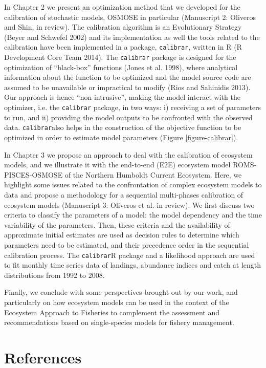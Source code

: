 In Chapter 2 we present an optimization method that we developed for the calibration of stochastic models, OSMOSE in particular (Manuscript 2: Oliveros and Shin, in review). The calibration algorithm is an Evolutionary Strategy (Beyer and Schwefel 2002) and its implementation as well the tools related to the calibration have been implemented in a package, \texttt{calibrar}, written in R (R Development Core Team 2014). The \texttt{calibrar} package is designed for the optimization of “black-box” functions (Jones et al. 1998), where analytical information about the function to be optimized and the model source code are assumed to be unavailable or impractical to modify (Rios and Sahinidis 2013). Our approach is hence “non-intrusive”, making the model interact with the optimizer, i.e. the \texttt{calibrar} package, in two ways: i) receiving a set of parameters to run, and ii) providing the model outputs to be confronted with the observed data. \texttt{calibrar}also helps in the construction of the objective function to be optimized in order to estimate model parameters (Figure \ref{figure-calibrar}).

In Chapter 3 we propose an approach to deal with the calibration of ecosystem models, and we illustrate it with the end-to-end (E2E) ecosystem model ROMS-PISCES-OSMOSE of the Northern Humboldt Current Ecosystem. Here, we highlight some issues related to the confrontation of complex ecosystem models to data and propose a methodology for a sequential multi-phases calibration of ecosystem models (Manuscript 3: Oliveros et al. in review). We first discuss two criteria to classify the parameters of a model: the model dependency and the time variability of the parameters. Then, these criteria and the availability of approximate initial estimates are used as decision rules to determine which parameters need to be estimated, and their precedence order in the sequential calibration process. The \texttt{calibrar}R package and a likelihood approach are used to fit  monthly time series data of landings, abundance indices and catch at length distributions from 1992 to 2008. 

Finally, we conclude with some perspectives brought out by our work, and particularly on how ecosystem models can be used in the context of the Ecosystem Approach to Fisheries to complement the assessment and recommendations based on single-species models for fishery management.

\section*{References}

